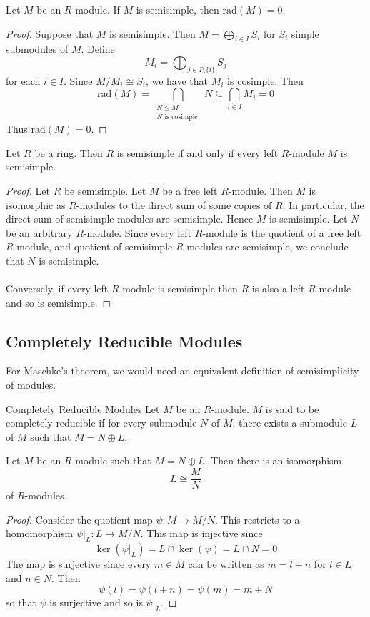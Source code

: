 \documentclass[a4paper]{article}
\begin{document}
\begin{lmm}{}{} Let $M$ be an $R$-module. If $M$ is semisimple, then $\text{rad}(M)=0$. 
\begin{proof}
Suppose that $M$ is semisimple. Then $M=\bigoplus_{i\in I}S_i$ for $S_i$ simple submodules of $M$. Define $$M_i=\bigoplus_{j\in I\setminus\{i\}}S_j$$ for each $i\in I$.  Since $M/M_i\cong S_i$, we have that $M_i$ is cosimple. Then $$\text{rad}(M)=\bigcap_{\substack{N\leq M\\N\text{ is cosimple }}}N\subseteq\bigcap_{i\in I}M_i=0$$ Thus $\text{rad}(M)=0$. 
\end{proof}
\end{lmm}

\begin{prp}{}{} Let $R$ be a ring. Then $R$ is semisimple if and only if every left $R$-module $M$ is semisimple. 
\begin{proof}
Let $R$ be semisimple. Let $M$ be a free left $R$-module. Then $M$ is isomorphic as $R$-modules to the direct sum of some copies of $R$. In particular, the direct sum of semisimple modules are semisimple. Hence $M$ is semisimple. Let $N$ be an arbitrary $R$-module. Since every left $R$-module is the quotient of a free left $R$-module, and quotient of semisimple $R$-modules are semisimple, we conclude that $N$ is semisimple. \\~\\

Conversely, if every left $R$-module is semisimple then $R$ is also a left $R$-module and so is semisimple. 
\end{proof}
\end{prp}

\subsection{Completely Reducible Modules}
For Maschke's theorem, we would need an equivalent definition of semisimplicity of modules. 

\begin{defn}{Completely Reducible Modules}{} Let $M$ be an $R$-module. $M$ is said to be completely reducible if for every submodule $N$ of $M$, there exists a submodule $L$ of $M$ such that $M=N\oplus L$. 
\end{defn}

\begin{prp}{}{} Let $M$ be an $R$-module such that $M=N\oplus L$. Then there is an isomorphism $$L\cong\frac{M}{N}$$ of $R$-modules. 
\begin{proof}
Consider the quotient map $\psi:M\to M/N$. This restricts to a homomorphism $\psi|_L:L\to M/N$. This map is injective since $$\ker(\psi|_L)=L\cap\ker(\psi)=L\cap N=0$$ The map is surjective since every $m\in M$ can be written as $m=l+n$ for $l\in L$ and $n\in N$. Then $$\psi(l)=\psi(l+n)=\psi(m)=m+N$$ so that $\psi$ is surjective and so is $\psi|_L$. 
\end{proof}
\end{prp}
\end{document}
